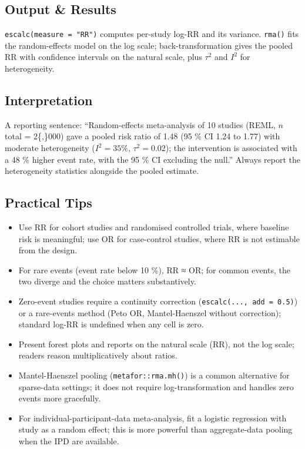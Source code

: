 \documentclass[
]{article}
\providecommand{\tightlist}{%
  \setlength{\itemsep}{0pt}\setlength{\parskip}{0pt}}
\begin{document}
\subsection{Output \& Results}\label{output-results}

\texttt{escalc(measure\ =\ "RR")} computes per-study log-RR and its
variance. \texttt{rma()} fits the random-effects model on the log scale;
back-transformation gives the pooled RR with confidence intervals on the
natural scale, plus \(\tau^2\) and \(I^2\) for heterogeneity.

\subsection{Interpretation}\label{interpretation}

A reporting sentence: ``Random-effects meta-analysis of 10 studies
(REML, \(n\) total = 2\{,\}000) gave a pooled risk ratio of 1.48 (95 \%
CI 1.24 to 1.77) with moderate heterogeneity (\(I^2 = 35 \%\),
\(\tau^2 = 0.02\)); the intervention is associated with a 48 \% higher
event rate, with the 95 \% CI excluding the null.'' Always report the
heterogeneity statistics alongside the pooled estimate.

\subsection{Practical Tips}\label{practical-tips}

\begin{itemize}
\tightlist
\item
  Use RR for cohort studies and randomised controlled trials, where
  baseline risk is meaningful; use OR for case-control studies, where RR
  is not estimable from the design.
\item
  For rare events (event rate below 10 \%), RR ≈ OR; for common events,
  the two diverge and the choice matters substantively.
\item
  Zero-event studies require a continuity correction
  (\texttt{escalc(...,\ add\ =\ 0.5)}) or a rare-events method (Peto OR,
  Mantel-Haenszel without correction); standard log-RR is undefined when
  any cell is zero.
\item
  Present forest plots and reports on the natural scale (RR), not the
  log scale; readers reason multiplicatively about ratios.
\item
  Mantel-Haenszel pooling (\texttt{metafor::rma.mh()}) is a common
  alternative for sparse-data settings; it does not require
  log-transformation and handles zero events more gracefully.
\item
  For individual-participant-data meta-analysis, fit a logistic
  regression with study as a random effect; this is more powerful than
  aggregate-data pooling when the IPD are available.
\end{itemize}
\end{document}
